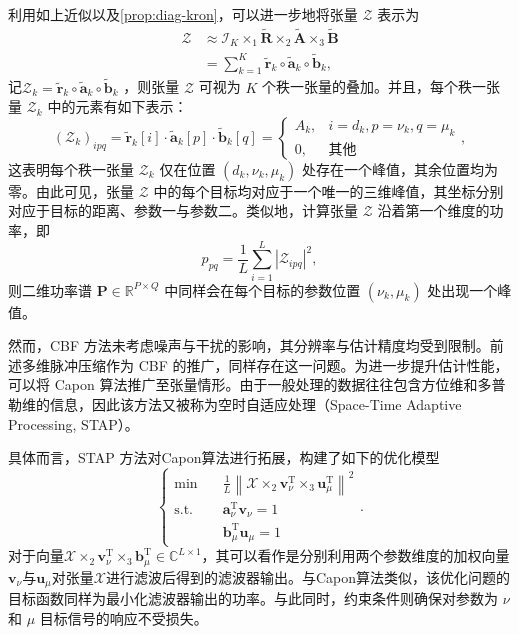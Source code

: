 利用如上近似以及\cref{prop:diag-kron}，可以进一步地将张量 \( \mathcal{Z} \) 表示为
\[
    \begin{split}
        \mathcal{Z}
         & \approx \mathcal{I}_K \times_1 \tilde{\mathbf{R}} \times_2 \tilde{\mathbf{A}} \times_3 \tilde{\mathbf{B}} \\
         & = \sum_{k=1}^K \tilde{\bm{r}}_k \circ \tilde{\bm{a}}_k \circ \tilde{\bm{b}}_k,
    \end{split}
\]
记\( \mathcal{Z}_k = \tilde{\bm{r}}_k \circ \tilde{\bm{a}}_k \circ \tilde{\bm{b}}_k \) ，则张量 \( \mathcal{Z} \) 可视为 \( K \) 个秩一张量的叠加。并且，每个秩一张量 \( \mathcal{Z}_k \) 中的元素有如下表示：
\[
    (\mathcal{Z}_k)_{ipq} =  \tilde{\bm{r}}_k[i] \cdot \tilde{\bm{a}}_k[p] \cdot \tilde{\bm{b}}_k[q] = \begin{cases}
        A_k, & i = d_k, p = \nu_k, q = \mu_k \\
        0,   & \text{其他}
    \end{cases},
\]
这表明每个秩一张量 \( \mathcal{Z}_k \) 仅在位置 \( (d_k, \nu_k, \mu_k) \) 处存在一个峰值，其余位置均为零。由此可见，张量 \( \mathcal{Z} \) 中的每个目标均对应于一个唯一的三维峰值，其坐标分别对应于目标的距离、参数一与参数二。类似地，计算张量 \( \mathcal{Z} \) 沿着第一个维度的功率，即
\[
    p_{pq} = \frac{1}{L} \sum_{i=1}^L |\mathcal{Z}_{ipq}|^2,
\]
则二维功率谱 \( \mathbf{P} \in \mathbb{R}^{P \times Q} \) 中同样会在每个目标的参数位置 \( (\nu_k, \mu_k) \) 处出现一个峰值。

然而，CBF 方法未考虑噪声与干扰的影响，其分辨率与估计精度均受到限制。前述多维脉冲压缩作为 CBF 的推广，同样存在这一问题。为进一步提升估计性能，可以将 Capon 算法推广至张量情形。由于一般处理的数据往往包含方位维和多普勒维的信息，因此该方法又被称为空时自适应处理（Space-Time Adaptive Processing, STAP）。

具体而言，STAP 方法对Capon算法进行拓展，构建了如下的优化模型
\[
    \begin{cases}
        \min \quad        & \frac{1}{L} \left\| \mathcal{X} \times_2 \bm{v}_{\nu}^{\mathrm{T}} \times_3 \bm{u}_{\mu}^{\mathrm{T}} \right\|^2 \\
        \text{s.t.} \quad & \bm{a}^{\mathrm{T}}_{\nu} \bm{v}_{\nu} = 1                                                                       \\
                          & \bm{b}^{\mathrm{T}}_{\mu} \bm{u}_{\mu} = 1
    \end{cases}.
\]
对于向量\( \mathcal{X} \times_2 \bm{v}_{\nu}^{\mathrm{T}} \times_3 \bm{b}_{\mu}^{\mathrm{T}} \in \mathbb{C}^{L \times 1} \)，其可以看作是分别利用两个参数维度的加权向量\( \bm{v}_{\nu} \)与\( \bm{u}_{\mu} \)对张量\( \mathcal{X} \)进行滤波后得到的滤波器输出。与Capon算法类似，该优化问题的目标函数同样为最小化滤波器输出的功率。与此同时，约束条件则确保对参数为 \( \nu \) 和 \( \mu \) 目标信号的响应不受损失。

